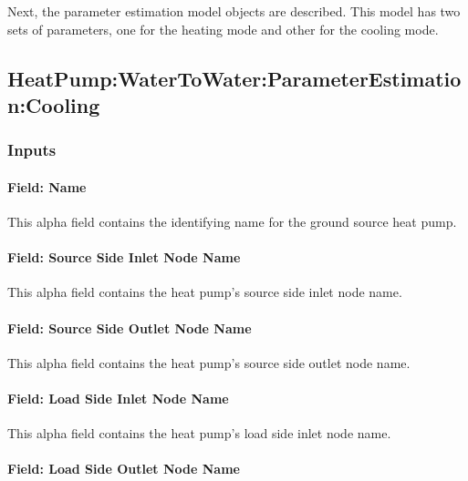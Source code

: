 Next, the parameter estimation model objects are described. This model has two sets of parameters, one for the heating mode and other for the cooling mode.

\subsection{HeatPump:WaterToWater:ParameterEstimation:Cooling}\label{heatpumpwatertowaterparameterestimationcooling}

\subsubsection{Inputs}\label{inputs-14-010}

\paragraph{Field: Name}\label{field-name-13-007}

This alpha field contains the identifying name for the ground source heat pump.

\paragraph{Field: Source Side Inlet Node Name}\label{field-source-side-inlet-node-name-2}

This alpha field contains the heat pump's source side inlet node name.

\paragraph{Field: Source Side Outlet Node Name}\label{field-source-side-outlet-node-name-2}

This alpha field contains the heat pump's source side outlet node name.

\paragraph{Field: Load Side Inlet Node Name}\label{field-load-side-inlet-node-name-2}

This alpha field contains the heat pump's load side inlet node name.

\paragraph{Field: Load Side Outlet Node Name}\label{field-load-side-outlet-node-name-2}

